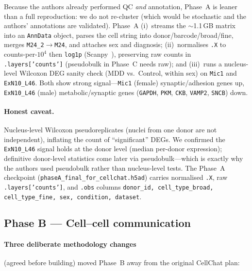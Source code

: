 \documentclass[11pt]{article}
\newcommand{\code}[1]{\texttt{\small #1}}
\begin{document}
Because the authors already performed QC \emph{and} annotation, Phase~A is
leaner than a full reproduction: we do not re-cluster (which would be stochastic
and the authors' annotations are validated). Phase~A (i)~streams the $\sim$1.1\,GB
matrix into an \code{AnnData} object, parses the cell string into
donor/barcode/broad/fine, merges \code{M24\_2}$\rightarrow$\code{M24}, and
attaches sex and diagnosis; (ii)~normalises \code{.X} to counts-per-$10^4$ then
\code{log1p} (Scanpy~\cite{scanpy}), preserving raw counts in
\code{.layers['counts']} (pseudobulk in
Phase~C needs raw); and (iii)~runs a nucleus-level Wilcoxon DEG sanity check
(MDD vs.\ Control, within sex) on \code{Mic1} and \code{ExN10\_L46}. Both show
strong signal---\code{Mic1} (female) synaptic/adhesion genes up, \code{ExN10\_L46}
(male) metabolic/synaptic genes (\code{GAPDH}, \code{PKM}, \code{CKB},
\code{VAMP2}, \code{SNCB}) down.

\paragraph{Honest caveat.} Nucleus-level Wilcoxon pseudoreplicates (nuclei from
one donor are not independent), inflating the count of ``significant'' DEGs. We
confirmed the \code{ExN10\_L46} signal holds at the donor level (median
per-donor expression); definitive donor-level statistics come later via
pseudobulk---which is exactly why the authors used pseudobulk rather than
nucleus-level tests. The Phase~A checkpoint
(\code{phaseA\_final\_for\_cellchat.h5ad}) carries normalised \code{.X}, raw
\code{.layers['counts']}, and \code{.obs} columns
\code{donor\_id, cell\_type\_broad, cell\_type\_fine, sex, condition, dataset}.

\subsection{Phase B --- Cell--cell communication}

\paragraph{Three deliberate methodology changes} (agreed before building) moved
Phase~B away from the original CellChat plan:
\end{document}

